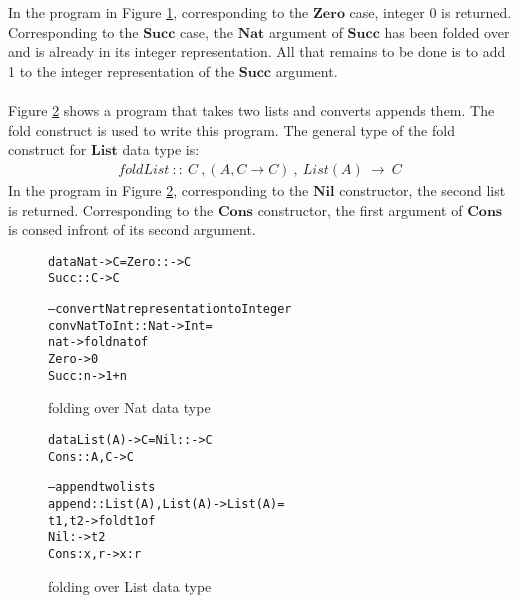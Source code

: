 \documentclass[11pt]{article}
\begin{document}
~~\\~~\\ 
In the program in Figure \ref {seqMPL:foldExampleFst}, corresponding to the $\mathbf{Zero}$ case, integer 0 is returned. Corresponding to the $\mathbf{Succ}$ case, the $\mathbf{Nat}$ argument of $\mathbf{Succ}$ has been folded over and is already in its integer representation. All that remains to be done is to add 1 to the integer representation of the $\mathbf{Succ}$ argument.
~~\\~~\\ 
Figure \ref {seqMPL:foldExampleSnd} shows a program that takes two lists and converts appends them. The {\sf fold} construct is used to write this program. The general type of the {\sf fold} construct for $\mathbf{List}$ data type is:
\begin{align*}
  foldList~::~C~,(A,C \to C)~,~ List(A) ~\to~ C
\end{align*}
In the program in Figure \ref {seqMPL:foldExampleSnd}, corresponding to the  $\mathbf{Nil}$ constructor, the second list is returned. Corresponding to the $\mathbf{Cons}$ constructor, the first argument of $\mathbf{Cons}$ is consed infront of its second argument.

\begin{figure}[!h]
\begin{alltt}

                data Nat -> C = Zero ::   -> C 
                                Succ :: C -> C

                -- convert Nat representation to Integer
                convNatToInt:: Nat -> Int =
                  nat -> fold nat of
                           Zero     -> 0
                           Succ : n -> 1 + n 
\end{alltt} 
\caption{folding over Nat data type}
\label{seqMPL:foldExampleFst}
\end{figure} 

\begin{figure}[!h]
\begin{alltt}

                data List(A) -> C = Nil  ::     -> C 
                                    Cons :: A,C -> C

                -- append two lists
                append :: List(A),List(A) -> List(A) =
                  t1,t2 -> fold t1 of
                             Nil  :    -> t2
                             Cons :x,r -> x:r
\end{alltt} 
\caption{folding over List data type}
\label{seqMPL:foldExampleSnd}
\end{figure} 
\end{document}
